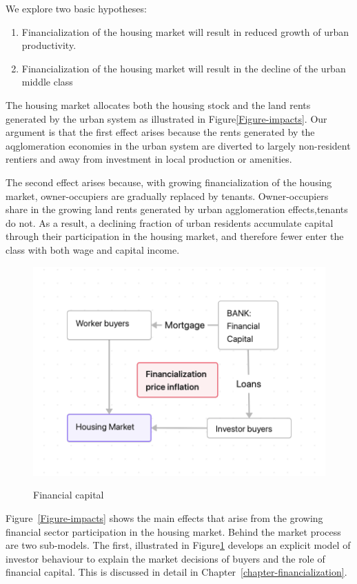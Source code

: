 We explore two basic hypotheses:
\begin{enumerate}
    \item Financialization of the housing market will result in reduced  growth of urban productivity.
    \item Financialization of the housing market will result in the decline of the urban middle class
\end{enumerate}

The housing market allocates both the housing stock and the land \glspl{rent} generated by the urban system as illustrated in Figure\ref{Figure-impacts}. Our argument is that the first effect arises because the rents generated by the aqglomeration economies in the urban system are diverted to largely non-resident \glspl{rentier} and away from investment in local production or amenities. 

The second effect arises because, with growing financialization of the housing market, owner-occupiers are gradually replaced by tenants.  Owner-occupiers share in the growing land rents generated by urban agglomeration effects,tenants do not. As a result, a declining fraction of urban residents  accumulate capital through their participation in the housing market, and therefore fewer enter the class with both wage and capital income. 

\begin{figure}[!ht]
    \centering
    \includegraphics[scale=.70]{fig/flow_financialization.png}
    \label{Fig-financial-cycle}
    \caption{Financial capital}
\end{figure}



Figure~\ref{Figure-impacts} shows the main effects  that  arise from the growing financial sector participation in the housing market. Behind the market process are two sub-models. The first, illustrated in Figure\ref{Fig-financial-cycle}  develops an explicit model of investor behaviour to explain the market decisions of buyers and the role of financial capital. This is discussed in detail in Chapter~\ref{chapter-financialization}.

